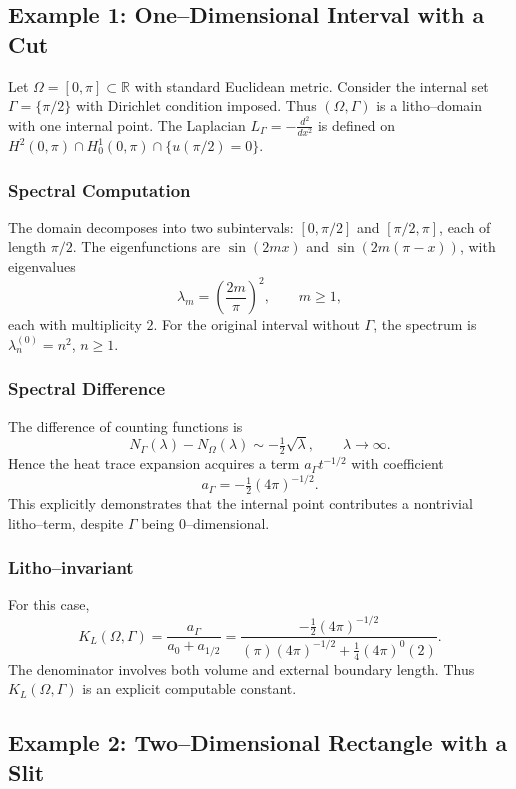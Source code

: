 \subsection{Example 1: One--Dimensional Interval with a Cut}

Let $\Omega = [0,\pi] \subset \mathbb{R}$ with standard Euclidean metric. 
Consider the internal set $\Gamma = \{\pi/2\}$ with Dirichlet condition imposed. 
Thus $(\Omega,\Gamma)$ is a litho--domain with one internal point. 
The Laplacian $L_\Gamma = -\frac{d^2}{dx^2}$ is defined on 
$H^2(0,\pi) \cap H^1_0(0,\pi) \cap \{ u(\pi/2)=0 \}$.

\subsubsection*{Spectral Computation}
The domain decomposes into two subintervals: $[0,\pi/2]$ and $[\pi/2,\pi]$, 
each of length $\pi/2$. 
The eigenfunctions are $\sin(2mx)$ and $\sin(2m(\pi-x))$, with eigenvalues
\[
\lambda_m = \left(\frac{2m}{\pi}\right)^2, \qquad m \ge 1,
\]
each with multiplicity $2$. 
For the original interval without $\Gamma$, the spectrum is 
$\lambda_n^{(0)} = n^2$, $n \ge 1$. 

\subsubsection*{Spectral Difference}
The difference of counting functions is
\[
N_\Gamma(\lambda) - N_\Omega(\lambda) \sim - \tfrac{1}{2} \sqrt{\lambda}, 
\qquad \lambda \to \infty.
\]
Hence the heat trace expansion acquires a term 
$a_\Gamma t^{-1/2}$ with coefficient
\[
a_\Gamma = -\tfrac{1}{2}(4\pi)^{-1/2}.
\]
This explicitly demonstrates that the internal point contributes a nontrivial 
litho--term, despite $\Gamma$ being $0$--dimensional. 

\subsubsection*{Litho--invariant}
For this case, 
\[
K_L(\Omega,\Gamma) 
= \frac{a_\Gamma}{a_0+a_{1/2}}
= \frac{-\tfrac{1}{2}(4\pi)^{-1/2}}{(\pi)(4\pi)^{-1/2} + \tfrac{1}{4}(4\pi)^0(2)}.
\]
The denominator involves both volume and external boundary length. 
Thus $K_L(\Omega,\Gamma)$ is an explicit computable constant. 

\subsection{Example 2: Two--Dimensional Rectangle with a Slit}

